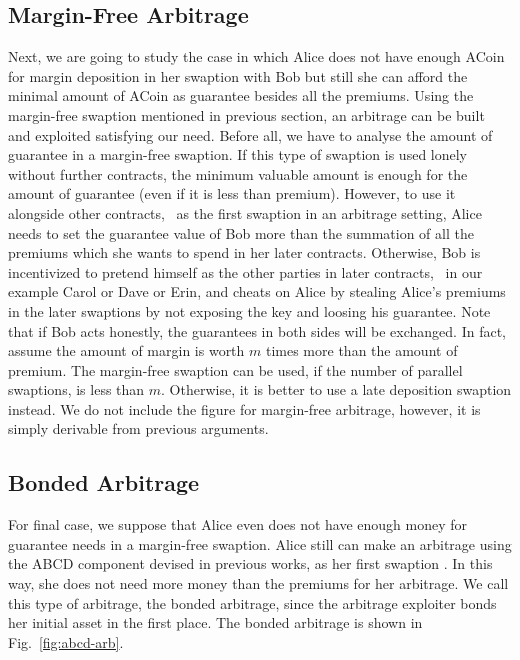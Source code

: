 \subsection{Margin-Free Arbitrage}
Next, we are going to study the case in which Alice does not have enough ACoin for margin deposition in her swaption with Bob but still she can afford the minimal amount of ACoin as guarantee besides all the premiums. Using the margin-free swaption mentioned in previous section, an arbitrage can be built and exploited satisfying our need. Before all, we have to analyse the amount of guarantee in a margin-free swaption. If this type of swaption is used lonely without further contracts, the minimum valuable amount is enough for the amount of guarantee (even if it is less than premium). However, to use it alongside other contracts, \eg~as the first swaption in an arbitrage setting, Alice needs to set the guarantee value of Bob more than the summation of all the premiums which she wants to spend in her later contracts. Otherwise, Bob is incentivized to pretend himself as the other parties in later contracts, \eg~in our example Carol or Dave or Erin, and cheats on Alice by stealing Alice's premiums in the later swaptions by not exposing the \keyone key and loosing his guarantee. Note that if Bob acts honestly, the guarantees in both sides will be exchanged. In fact, assume the amount of margin is worth $m$ times more than the amount of premium. The margin-free swaption can be used, if the number of parallel swaptions, is less than $m$. Otherwise, it is better to use a late deposition swaption instead. We do not include the figure for margin-free arbitrage, however, it is simply derivable from previous arguments.

\subsection{Bonded Arbitrage}
For final case, we suppose that Alice even does not have enough money for guarantee needs in a margin-free swaption. Alice still can make an arbitrage using the ABCD component devised in previous works, as her first swaption \cite{tefagh2020atomic}. In this way, she does not need more money than the premiums for her arbitrage. We call this type of arbitrage, the bonded arbitrage, since the arbitrage exploiter bonds her initial asset in the first place. The bonded arbitrage is shown in Fig.~\ref{fig:abcd-arb}.

